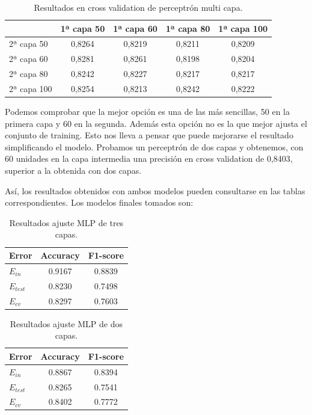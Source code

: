 \documentclass[11pt,a4paper]{article}
\begin{document}
\begin{table}[h]
\begin{center}
\begin{tabular}{|l|c|c|c|c|}
\hline

  & 1ª capa 50 & 1ª capa 60 & 1ª capa 80 & 1ª capa 100 \\ \hline
  2ª capa 50 & 0,8264 & 0,8219 & 0,8211 & 0,8209\\
  2ª capa 60 & 0,8281 & 0,8261 & 0,8198 & 0,8204\\
  2ª capa 80 & 0,8242 & 0,8227 & 0,8217 & 0,8217\\
  2ª capa 100 & 0,8254 & 0,8213 & 0,8242 & 0,8222\\\hline
\end{tabular}
\caption{Resultados en cross validation de perceptrón multi capa.}
\end{center}
\end{table}

Podemos comprobar que la mejor opción es una de las más sencillas, 50 en la primera capa y 60 en la segunda. Además esta opción no es la que mejor ajusta el conjunto de training. Esto nos lleva a pensar que puede mejorarse el resultado simplificando el modelo. Probamos un perceptrón de dos capas y obtenemos, con 60 unidades en la capa intermedia una precisión en cross validation de 0,8403, superior a la obtenida con dos capas.

Así, los resultados obtenidos con ambos modelos pueden consultarse en las tablas correspondientes. Los modelos finales tomados son:

\begin{table}[h]
\begin{center}
\begin{tabular}{|l|c|c|}
\hline
  Error & Accuracy & F1-score \\ \hline
  $E_{in}$ & 0.9167 & 0.8839 \\
  $E_{test}$ & 0.8230 & 0.7498  \\
  $E_{cv}$ & 0.8297 & 0.7603  \\\hline\end{tabular}
\caption{Resultados ajuste MLP de tres capas.}

\end{center}
\end{table}

\begin{table}[h]
\begin{center}
\begin{tabular}{|l|c|c|}
\hline
  Error & Accuracy & F1-score \\ \hline
  $E_{in}$ & 0.8867 & 0.8394 \\
  $E_{test}$ & 0.8265 & 0.7541  \\
  $E_{cv}$ & 0.8402 & 0.7772  \\\hline
\end{tabular}
\caption{Resultados ajuste MLP de dos capas.}

\end{center}
\end{table}
\end{document}
